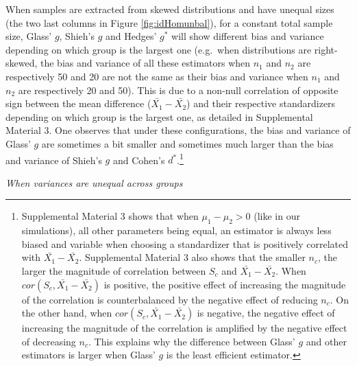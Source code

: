 \documentclass[
  english,
  man,floatsintext]{apa6}
\begin{document}
When samples are extracted from skewed distributions and have unequal sizes (the two last columns in Figure \ref{fig:idHomunbal}), for a constant total sample size, Glass' \(g\), Shieh's \(g\) and Hedges' \(g^*\) will show different bias and variance depending on which group is the largest one (e.g.~when distributions are right-skewed, the bias and variance of all these estimators when \(n_1\) and \(n_2\) are respectively 50 and 20 are not the same as their bias and variance when \(n_1\) and \(n_2\) are respectively 20 and 50). This is due to a non-null correlation of opposite sign between the mean difference (\(\bar{X_1}-\bar{X_2}\)) and their respective standardizers depending on which group is the largest one, as detailed in Supplemental Material 3. One observes that under these configurations, the bias and variance of Glass' \(g\) are sometimes a bit smaller and sometimes much larger than the bias and variance of Shieh's \(g\) and Cohen's \(d^*\).\footnote{Supplemental Material 3 shows that when $\mu_1-\mu_2 >0$ (like in our simulations), all other parameters being equal, an estimator is always less biased and variable when choosing a standardizer that is positively correlated with $\bar{X_1}-\bar{X_2}$. Supplemental Material 3 also shows that the smaller $n_c$, the larger the magnitude of correlation between $S_c$ and $\bar{X_1}-\bar{X_2}$. When $cor(S_c,\bar{X_1}-\bar{X_2})$ is positive, the positive effect of increasing the magnitude of the correlation is counterbalanced by the negative effect of reducing $n_c$. On the other hand, when $cor(S_c,\bar{X_1}-\bar{X_2})$ is negative, the negative effect of increasing the magnitude of the correlation is amplified by the negative effect of decreasing $n_c$. This explains why the difference between Glass' $g$ and other estimators is larger when Glass' $g$ is the least efficient estimator.}

\emph{When variances are unequal across groups}
\end{document}
